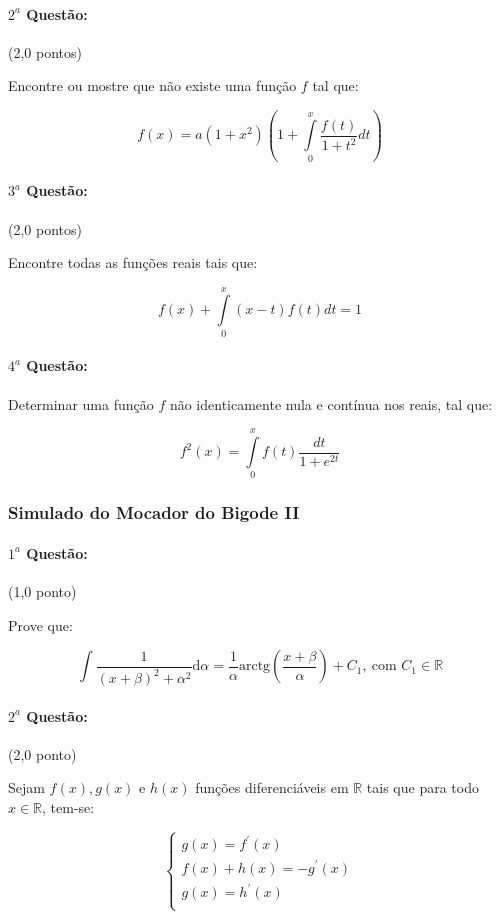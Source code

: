 \documentclass[12pt,a4paper]{article}
\newcommand{\dd}{\mathrm{d}}
\begin{document}
\paragraph{$2^a$ Questão:} (2,0 pontos)

Encontre ou mostre que não existe uma função $f$ tal que:

$$ f(x)=a(1+x^2)(1+\displaystyle\int\limits_0^x \dfrac{f(t)}{1+t^2}dt) $$
\paragraph{$3^a$ Questão:} (2,0 pontos)

Encontre todas as funções reais tais que:

$$f(x)+\displaystyle\int\limits_0^x (x-t)f(t)dt=1$$
\paragraph{$4^a$ Questão:}

Determinar uma função $f$ não identicamente nula e contínua nos reais, tal que:

$$f^2(x)=\displaystyle\int\limits_0^x f(t)\dfrac{dt}{1+e^{2t}}$$

\newpage

\subsubsection{Simulado do Mocador do Bigode II}
\paragraph{$1^a$ Questão:} (1,0 ponto)

Prove que:

$$ \displaystyle\int \dfrac{1}{(x+\beta)^2+\alpha^2} \dd \alpha = \dfrac{1}{\alpha} \textrm{arctg}\left(\dfrac{x+\beta}{\alpha} \right) + C_1, \ \textrm{com } C_1 \in \mathbb{R}$$

\paragraph{$2^a$ Questão:} (2,0 ponto)

Sejam $f(x),g(x)$ e $h(x)$ funções diferenciáveis em $\mathbb{R}$ tais que para todo $x \in \mathbb{R}$, tem-se:

$$
\begin{cases}
g(x)=f^\prime(x) \\
f(x)+h(x)=-g^\prime(x) \\
g(x)=h^\prime (x) \\
\end{cases}
$$
\end{document}
